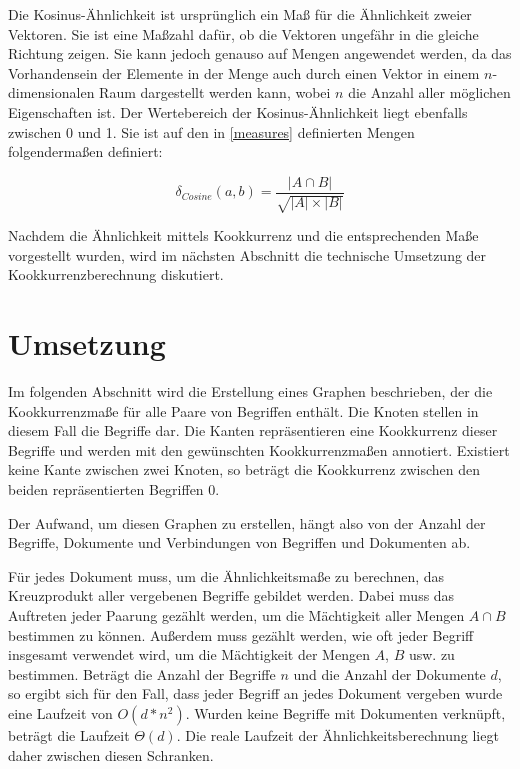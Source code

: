 Die Kosinus-Ähnlichkeit \cite{hkp2012} ist ursprünglich ein Maß für die Ähnlichkeit zweier Vektoren. Sie ist eine Maßzahl dafür, ob die Vektoren ungefähr in die gleiche Richtung zeigen. Sie kann jedoch genauso auf Mengen angewendet werden, da das Vorhandensein der Elemente in der Menge auch durch einen Vektor in einem \(n\)-dimensionalen Raum dargestellt werden kann, wobei \(n\) die Anzahl aller möglichen Eigenschaften ist. Der Wertebereich der Kosinus-Ähnlichkeit liegt ebenfalls zwischen \num{0} und \num{1}. Sie ist auf den in \ref{measures} definierten Mengen folgendermaßen definiert:

\[
\delta_{Cosine}(a, b) = \frac{|A \cap B|}{\sqrt{|A| \times |B|}}
\]

Nachdem die Ähnlichkeit mittels Kookkurrenz und die entsprechenden Maße vorgestellt wurden, wird im nächsten Abschnitt die technische Umsetzung der Kookkurrenzberechnung diskutiert.

\section{Umsetzung}

Im folgenden Abschnitt wird die Erstellung eines Graphen beschrieben, der die Kookkurrenzmaße für alle Paare von Begriffen enthält. Die Knoten stellen in diesem Fall die Begriffe dar. Die Kanten repräsentieren eine Kookkurrenz dieser Begriffe und werden mit den gewünschten Kookkurrenzmaßen annotiert. Existiert keine Kante zwischen zwei Knoten, so beträgt die Kookkurrenz zwischen den beiden repräsentierten Begriffen \num{0}.

Der Aufwand, um diesen Graphen zu erstellen, hängt also von der Anzahl der Begriffe, Dokumente und Verbindungen von Begriffen und Dokumenten ab.

Für jedes Dokument muss, um die Ähnlichkeitsmaße zu berechnen, das Kreuzprodukt aller vergebenen Begriffe gebildet werden. Dabei muss das Auftreten jeder Paarung gezählt werden, um die Mächtigkeit aller Mengen \(A \cap B\) bestimmen zu können. Außerdem muss gezählt werden, wie oft jeder Begriff insgesamt verwendet wird, um die Mächtigkeit der Mengen \(A\), \(B\) usw. zu bestimmen. Beträgt die Anzahl der Begriffe \(n\) und die Anzahl der Dokumente \(d\), so ergibt sich für den Fall, dass jeder Begriff an jedes Dokument vergeben wurde eine Laufzeit von \(O(d*n^2)\). Wurden keine Begriffe mit Dokumenten verknüpft, beträgt die Laufzeit \(\Theta(d)\). Die reale Laufzeit der Ähnlichkeitsberechnung liegt daher zwischen diesen Schranken.

